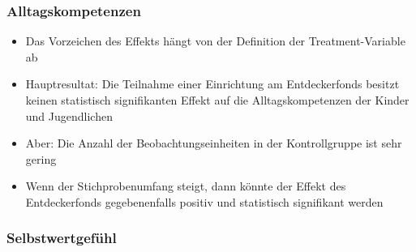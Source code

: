 \begin{frame}[fragile]
\begin{itemize}
\begin{frame}
\begin{itemize}
\begin{frame}[fragile]
\frametitle{Alltagskompetenzen}
\begin{itemize}
\item Das Vorzeichen des Effekts hängt von der Definition der Treatment-Variable ab
\item Hauptresultat: Die Teilnahme einer Einrichtung am Entdeckerfonds besitzt keinen statistisch signifikanten Effekt auf die Alltagskompetenzen der Kinder und Jugendlichen
\item Aber: Die Anzahl der Beobachtungseinheiten in der Kontrollgruppe ist sehr gering
\item Wenn der Stichprobenumfang steigt, dann könnte der Effekt des Entdeckerfonds gegebenenfalls positiv und statistisch signifikant werden
\end{itemize}
\end{frame}

\begin{frame}[fragile]
\frametitle{Selbstwertgefühl}
\begin{table}
\begin{center}
\caption{DID-Schätzung: Ergebnisse für Selbstwertgefühl}
\end{center}
\end{table}
\end{frame}


\end{itemize}
\end{frame}
\end{itemize}
\end{frame}
